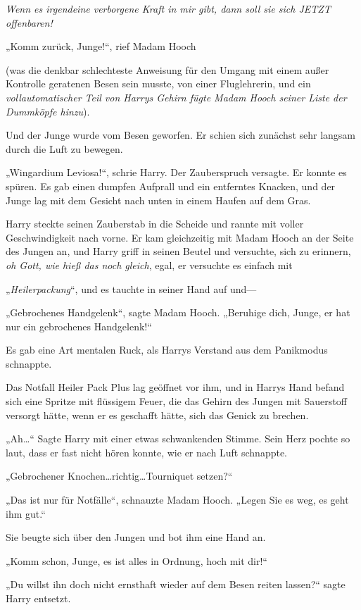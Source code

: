 {\emph{Wenn es irgendeine verborgene Kraft in mir gibt, dann soll sie sich JETZT offenbaren!}

„Komm zurück, Junge!“, rief Madam Hooch

(was die denkbar schlechteste Anweisung für den Umgang mit einem außer Kontrolle geratenen Besen sein musste, von einer Fluglehrerin, und ein \emph{vollautomatischer Teil von Harrys Gehirn fügte Madam Hooch seiner Liste der Dummköpfe hinzu}).

Und der Junge wurde vom Besen geworfen. Er schien sich zunächst sehr langsam durch die Luft zu bewegen.

„Wingardium Leviosa!“, schrie Harry. Der Zauberspruch versagte. Er konnte es spüren. Es gab einen dumpfen Aufprall und ein entferntes Knacken, und der Junge lag mit dem Gesicht nach unten in einem Haufen auf dem Gras.

Harry steckte seinen Zauberstab in die Scheide und rannte mit voller Geschwindigkeit nach vorne. Er kam gleichzeitig mit Madam Hooch an der Seite des Jungen an, und Harry griff in seinen Beutel und versuchte, sich zu erinnern, \emph{oh Gott, wie hieß das noch gleich}, egal, er versuchte es einfach mit

„\emph{Heilerpackung}“, und es tauchte in seiner Hand auf und—

„Gebrochenes Handgelenk“, sagte Madam Hooch. „Beruhige dich, Junge, er hat nur ein gebrochenes Handgelenk!“

Es gab eine Art mentalen Ruck, als Harrys Verstand aus dem Panikmodus schnappte.

Das Notfall Heiler Pack Plus lag geöffnet vor ihm, und in Harrys Hand befand sich eine Spritze mit flüssigem Feuer, die das Gehirn des Jungen mit Sauerstoff versorgt hätte, wenn er es geschafft hätte, sich das Genick zu brechen.

„Ah…“ Sagte Harry mit einer etwas schwankenden Stimme. Sein Herz pochte so laut, dass er fast nicht hören konnte, wie er nach Luft schnappte.

„Gebrochener Knochen…richtig…Tourniquet setzen?“

„Das ist nur für Notfälle“, schnauzte Madam Hooch. „Legen Sie es weg, es geht ihm gut.“

Sie beugte sich über den Jungen und bot ihm eine Hand an.

„Komm schon, Junge, es ist alles in Ordnung, hoch mit dir!“

„Du willst ihn doch nicht ernsthaft wieder auf dem Besen reiten lassen?“ sagte Harry entsetzt.

}
